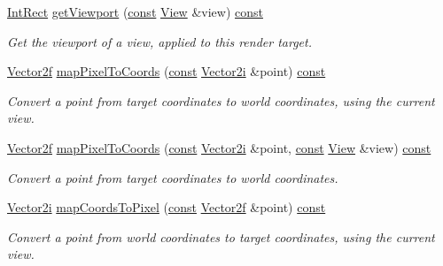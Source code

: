 \begin{DoxyCompactItemize}
\hyperlink{namespacesf_a1b1279ab06950b96686cffaacb72fed5}{Int\-Rect} \hyperlink{classsf_1_1_render_target_aae035b0d45f87a0da2a28a0de6ba1086}{get\-Viewport} (\hyperlink{term__entry_8h_a57bd63ce7f9a353488880e3de6692d5a}{const} \hyperlink{classsf_1_1_view}{View} \&view) \hyperlink{term__entry_8h_a57bd63ce7f9a353488880e3de6692d5a}{const} 
\begin{DoxyCompactList}\small\item\em Get the viewport of a view, applied to this render target. \end{DoxyCompactList}\item 
\hyperlink{namespacesf_a80cea3c46537294fd1d8d428566ad8b2}{Vector2f} \hyperlink{classsf_1_1_render_target_a2b0cab0e4c6af29d4efaba149d28116d}{map\-Pixel\-To\-Coords} (\hyperlink{term__entry_8h_a57bd63ce7f9a353488880e3de6692d5a}{const} \hyperlink{namespacesf_a0eed58bf66694ebbc55f72ca7de840d9}{Vector2i} \&point) \hyperlink{term__entry_8h_a57bd63ce7f9a353488880e3de6692d5a}{const} 
\begin{DoxyCompactList}\small\item\em Convert a point from target coordinates to world coordinates, using the current view. \end{DoxyCompactList}\item 
\hyperlink{namespacesf_a80cea3c46537294fd1d8d428566ad8b2}{Vector2f} \hyperlink{classsf_1_1_render_target_a46eb08f775dd1420d6207ea87dde6e54}{map\-Pixel\-To\-Coords} (\hyperlink{term__entry_8h_a57bd63ce7f9a353488880e3de6692d5a}{const} \hyperlink{namespacesf_a0eed58bf66694ebbc55f72ca7de840d9}{Vector2i} \&point, \hyperlink{term__entry_8h_a57bd63ce7f9a353488880e3de6692d5a}{const} \hyperlink{classsf_1_1_view}{View} \&view) \hyperlink{term__entry_8h_a57bd63ce7f9a353488880e3de6692d5a}{const} 
\begin{DoxyCompactList}\small\item\em Convert a point from target coordinates to world coordinates. \end{DoxyCompactList}\item 
\hyperlink{namespacesf_a0eed58bf66694ebbc55f72ca7de840d9}{Vector2i} \hyperlink{classsf_1_1_render_target_aa0c11e1989573f2cce64c621205f8e83}{map\-Coords\-To\-Pixel} (\hyperlink{term__entry_8h_a57bd63ce7f9a353488880e3de6692d5a}{const} \hyperlink{namespacesf_a80cea3c46537294fd1d8d428566ad8b2}{Vector2f} \&point) \hyperlink{term__entry_8h_a57bd63ce7f9a353488880e3de6692d5a}{const} 
\begin{DoxyCompactList}\small\item\em Convert a point from world coordinates to target coordinates, using the current view. \end{DoxyCompactList}\item 

\end{DoxyCompactItemize}
